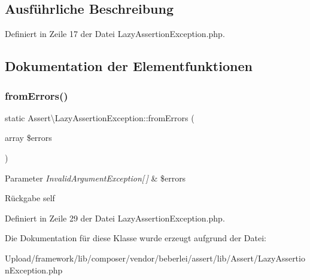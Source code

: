 \subsection{Ausführliche Beschreibung}


Definiert in Zeile 17 der Datei Lazy\+Assertion\+Exception.\+php.



\subsection{Dokumentation der Elementfunktionen}
\mbox{\label{class_assert_1_1_lazy_assertion_exception_a27d4136341663ab6231fa78483105613}} 
\subsubsection{\texorpdfstring{from\+Errors()}{fromErrors()}}
{\footnotesize\ttfamily static Assert\textbackslash{}\+Lazy\+Assertion\+Exception\+::from\+Errors (\begin{DoxyParamCaption}\item[{array}]{\$errors }\end{DoxyParamCaption})\hspace{0.3cm}{\ttfamily [static]}}


\begin{DoxyParams}{Parameter}
{\em Invalid\+Argument\+Exception\mbox{[}$\,$\mbox{]}} & \$errors\\
\hline
\end{DoxyParams}
\begin{DoxyReturn}{Rückgabe}
self 
\end{DoxyReturn}


Definiert in Zeile 29 der Datei Lazy\+Assertion\+Exception.\+php.



Die Dokumentation für diese Klasse wurde erzeugt aufgrund der Datei\+:\begin{DoxyCompactItemize}
\item 
Upload/framework/lib/composer/vendor/beberlei/assert/lib/\+Assert/Lazy\+Assertion\+Exception.\+php\end{DoxyCompactItemize}
